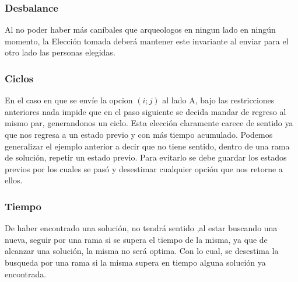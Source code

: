 \subsubsection*{Desbalance}
Al no poder haber más caníbales que arqueologos en ningun lado en ningún momento, la Elección tomada deberá mantener este invariante al enviar para el otro lado las personas elegidas.

\subsubsection*{Ciclos}
En el caso en que se envíe la opcion $(i; j)$ al lado A, bajo las restricciones anteriores nada impide que en el paso siguiente se decida mandar de regreso al mismo par, generandonos un ciclo. Esta elección claramente carece de sentido ya que nos regresa a un estado previo y con más tiempo acumulado. Podemos generalizar el ejemplo anterior a decir que no tiene sentido, dentro de una rama de solución, repetir un estado previo. Para evitarlo se debe guardar los estados previos por los cuales se pasó y desestimar cualquier opción que nos retorne a ellos.

\subsubsection*{Tiempo}
De haber encontrado una solución, no tendrá sentido ,al estar buscando una nueva, seguir por una rama si se supera el tiempo de la misma, ya que de alcanzar una solución, la misma no será optima. Con lo cual, se desestima la busqueda por una rama si la misma supera en tiempo alguna solución ya encontrada.